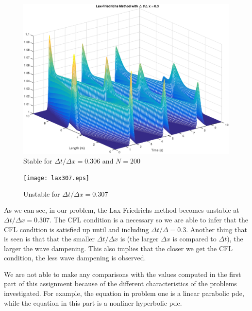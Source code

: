 \begin{figure}
\begin{center}
\includegraphics[scale=0.6]{lax03.eps}
\caption{Stable for $\Delta t/ \Delta x=0.306$ and $N = 200$}
\label{c}
\end{center}
\end{figure}

\begin{figure}
\begin{center}
\texttt{[image: lax307.eps]}
\caption{Unstable for $\Delta t /\Delta x=0.307$}
\label{d}
\end{center}
\end{figure}

As we can see, in our problem, the Lax-Friedrichs method becomes unstable at $\Delta t/\Delta x=0.307$. The CFL condition is a necessary so we are able to infer that the CFL condition is satisfied up until and including $\Delta t/\Delta = 0.3$. Another thing that is seen is that that the smaller $\Delta t/\Delta x$ is (the larger $\Delta x$ is compared to $\Delta t$), the larger the wave dampening. This also implies that the closer we get the CFL condition, the less wave dampening is observed. 

We are not able to make any comparisons with the values computed in the first part of this assignment because of the different characteristics of the problems investigated. For example, the equation in problem one is a linear parabolic pde, while the equation in this part is a nonliner hyperbolic pde. 

